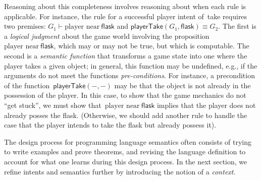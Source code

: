 Reasoning about this completeness involves reasoning about when each
rule is applicable.  
%
For instance, the rule for a successful player intent of~\textsf{take}
requires two premises:
$G_1 \vdash \textrm{player near}~\textsf{flask}$
and
$\textsf{playerTake}(G_1,\textsf{flask}) \equiv G_2$.
%
The first is a \emph{logical judgment} about the game world involving
the proposition~$\textrm{player near}~\textsf{flask}$, which may or
may not be true, but which is computable.
%
The second is a \emph{semantic function} that transforms a game state
into one where the player takes a given object; in general, this
function may be undefined, e.g., if the arguments do not meet the
functions \emph{pre-conditions}.
%
For instance, a precondition of the
function~$\textsf{playerTake}(-,-)$ may be that the object is not
already in the possession of the player.
%
In this case, to show that the game mechanics do not ``get stuck'', we
must show that~$\textrm{player near}~\textsf{flask}$ implies that the
player does not already posses the flask.
%
(Otherwise, we should add another rule to handle the case that the
player intends to take the flask but already possess it).
%

The design process for programming language semantics often consists of
trying to write examples and prove theorems, and revising the language
definition to account for what one learns during this design process.
%
In the next section, we refine intents and semantics further by
introducing the notion of a \emph{context}.



